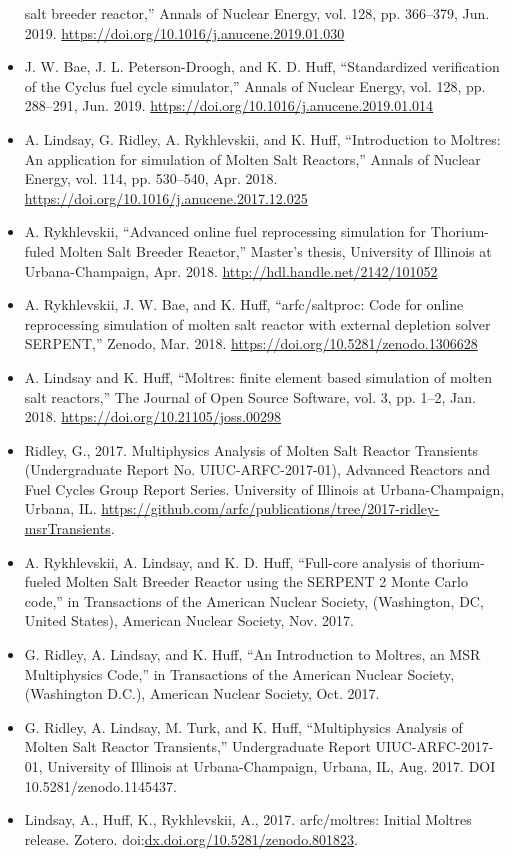 \documentclass[letterpaper]{article}
\begin{document}
\begin{itemize}
                salt breeder reactor,'' Annals of Nuclear Energy, vol. 128, pp. 
                366–379, Jun. 2019. 
                \url{https://doi.org/10.1016/j.anucene.2019.01.030}
        \item J. W. Bae, J. L. Peterson-Droogh, and K. D. Huff, “Standardized 
                verification of the Cyclus fuel cycle simulator,” Annals of 
                Nuclear Energy, vol. 128, pp. 288–291, Jun. 2019. 
                \url{https://doi.org/10.1016/j.anucene.2019.01.014}
        \item A. Lindsay, G. Ridley, A. Rykhlevskii, and K. Huff, 
                ``Introduction to Moltres: An application for simulation of 
                Molten Salt Reactors,'' Annals of Nuclear Energy, vol. 114, pp. 
                530–540, Apr. 2018. \url{https://doi.org/10.1016/j.anucene.2017.12.025}
        \item A. Rykhlevskii, ``Advanced online fuel reprocessing simulation 
                for Thorium-fuled Molten Salt Breeder Reactor,'' Master’s 
                thesis, University of Illinois at Urbana-Champaign, Apr. 2018. 
                \url{http://hdl.handle.net/2142/101052}
        \item A. Rykhlevskii, J. W. Bae, and K. Huff, ``arfc/saltproc: Code for 
                online reprocessing simulation of molten salt reactor with 
                external depletion solver SERPENT,'' Zenodo, Mar. 2018. 
                \url{https://doi.org/10.5281/zenodo.1306628}
        \item A. Lindsay and K. Huff, ``Moltres: finite element based 
                simulation of molten salt reactors,'' The Journal of Open 
                Source Software, vol. 3, pp. 1–2, Jan. 2018. 
                \url{https://doi.org/10.21105/joss.00298}
        \item Ridley, G., 2017. Multiphysics Analysis of Molten Salt Reactor Transients (Undergraduate Report No. UIUC-ARFC-2017-01), Advanced Reactors and Fuel Cycles Group Report Series. University of Illinois at Urbana-Champaign, Urbana, IL. \url{https://github.com/arfc/publications/tree/2017-ridley-msrTransients}.
        \item A. Rykhlevskii, A. Lindsay, and K. D. Huff, ``Full-core analysis of thorium-fueled Molten Salt Breeder Reactor using the SERPENT 2 Monte Carlo code,'' in Transactions of the American Nuclear Society, (Washington, DC, United States), American Nuclear Society, Nov. 2017.
        \item G. Ridley, A. Lindsay, and K. Huff, ``An Introduction to Moltres, an MSR Multiphysics Code,'' in Transactions of the American Nuclear Society, (Washington D.C.), American Nuclear Society, Oct. 2017.
        \item G. Ridley, A. Lindsay, M. Turk, and K. Huff, ``Multiphysics Analysis of Molten Salt Reactor Transients,'' Undergraduate Report UIUC-ARFC-2017-01, University of Illinois at Urbana-Champaign, Urbana, IL, Aug. 2017. DOI 10.5281/zenodo.1145437.
	\item Lindsay, A., Huff, K., Rykhlevskii, A., 2017. arfc/moltres: Initial Moltres release. Zotero. doi:\url{dx.doi.org/10.5281/zenodo.801823}.
\end{itemize}
\end{document}
